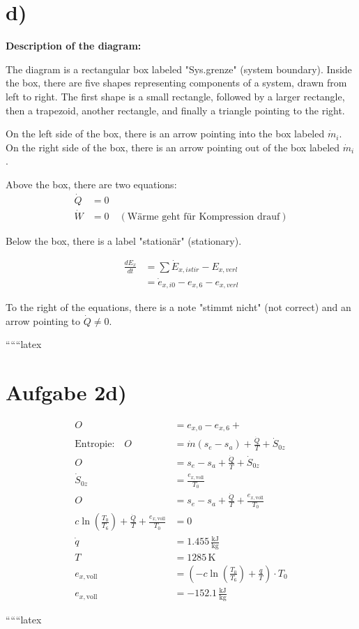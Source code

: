 

\section*{d)}

\textbf{Description of the diagram:}

The diagram is a rectangular box labeled "Sys.grenze" (system boundary). Inside the box, there are five shapes representing components of a system, drawn from left to right. The first shape is a small rectangle, followed by a larger rectangle, then a trapezoid, another rectangle, and finally a triangle pointing to the right. 

On the left side of the box, there is an arrow pointing into the box labeled $\dot{m}_i$. On the right side of the box, there is an arrow pointing out of the box labeled $\dot{m}_i$.

Above the box, there are two equations:
\begin{align*}
    \dot{Q} &= 0 \\
    \dot{W} &= 0 \quad (\text{Wärme geht für Kompression drauf})
\end{align*}

Below the box, there is a label "stationär" (stationary).

\begin{align*}
    \frac{dE_x}{dt} &= \sum \dot{E}_{x,istir} - E_{x,verl} \\
    &= \dot{e}_{x,i0} - e_{x,6} - e_{x,verl}
\end{align*}

To the right of the equations, there is a note "stimmt nicht" (not correct) and an arrow pointing to $\dot{Q} \neq 0$.

``````latex

\section*{Aufgabe 2d)}

\begin{align*}
O &= e_{x,0} - e_{x,6} + \\
\text{Entropie:} \quad O &= \dot{m} (s_e - s_a) + \frac{\dot{Q}}{T} + \dot{S}_{0z} \\
O &= s_e - s_a + \frac{\dot{Q}}{T} + \dot{S}_{0z} \\
\dot{S}_{0z} &= \frac{e_{x,\text{voll}}}{T_0} \\
O &= s_e - s_a + \frac{\dot{Q}}{T} + \frac{e_{x,\text{voll}}}{T_0} \\
c \ln \left( \frac{T_0}{T_6} \right) + \frac{\dot{Q}}{T} + \frac{e_{x,\text{voll}}}{T_0} &= 0 \\
\dot{q} &= 1.455 \, \frac{\text{kJ}}{\text{kg}} \\
T &= 1285 \, \text{K} \\
e_{x,\text{voll}} &= \left( -c \ln \left( \frac{T_0}{T_6} \right) + \frac{q}{T} \right) \cdot T_0 \\
e_{x,\text{voll}} &= -152.1 \, \frac{\text{kJ}}{\text{kg}}
\end{align*}

``````latex